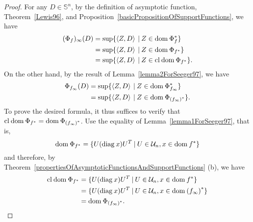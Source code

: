 \documentclass[a4paper,11pt, oneside]{book}
\theoremstyle{definition}
\newcommand{\NDemenstionalRealSymmetricMatrixSpace}{\mathbb{S}^n}
\newcommand{\NDemenstionalRealOthonormalMatrixSpace}{\mathcal{U}_n}
\newcommand{\Closure}[1]{\text{\rm cl\:${#1}$}} %
\newcommand{\Domain}[1]{\text{\rm dom\:${#1}$}} %
\newcommand{\Diagnosis}[1]{\text{\rm diag\:${#1}$}} %
\newcommand{\InnerProduct}[2]{\left\langle {#1},{#2}\right\rangle} %
\newcommand{\ConjugateFunction}[1]{{#1}^*}
\newcommand{\SetForm}[2]{
  \{{#1}\:|\:{#2}\}
}
\begin{document}
\begin{proof}
  For any $D \in \NDemenstionalRealSymmetricMatrixSpace$, by the definition of asymptotic function, Theorem~\ref{Lewis96}, and Proposition~\ref{basicPropositionOfSupportFunctions}, we have
  \begin{equation}
    \begin{split}
      (\Phi_f)_{\infty}(D) &= \sup \{\InnerProduct{Z}{D} \:|\: Z \in \Domain{\Phi_{f}^*} \}\\
      &= \sup \{\InnerProduct{Z}{D} \:|\: Z \in \Domain{\Phi_{\ConjugateFunction{f}}} \}\\
      &= \sup \{\InnerProduct{Z}{D} \:|\: Z \in \Closure{\Domain{\Phi_{\ConjugateFunction{f}}}} \}. \notag
    \end{split}
  \end{equation}
  On the other hand, by the result of Lemma~\ref{lemma2ForSeeger97}, we have
  \begin{equation}
    \begin{split}
      \Phi_{f_{\infty}}(D) &= \sup \{\InnerProduct{Z}{D} \:|\: Z \in \Domain{\Phi_{f_{\infty}}^*} \}\\
      &= \sup \{\InnerProduct{Z}{D} \:|\: Z \in \Domain{\Phi_{\ConjugateFunction{(f_{\infty})}}} \}. \notag
    \end{split}
  \end{equation}
  To prove the desired formula, it thus suffices to verify that $\Closure{\Domain{\Phi_{\ConjugateFunction{f}}}} = \Domain{\Phi_{\ConjugateFunction{(f_{\infty})}}}$. Use the equality of Lemma~\ref{lemma1ForSeeger97}, that is,
  \begin{equation}
    \Domain{\Phi_{\ConjugateFunction{f}}} = \SetForm{U (\Diagnosis{x}) U^T}{U \in \NDemenstionalRealOthonormalMatrixSpace, x \in \Domain{\ConjugateFunction{f}}} \notag
  \end{equation}
  and therefore, by Theorem~\ref{propertiesOfAsymptoticFunctionsAndSupportFunctions} (b), we have
  \begin{equation}
    \begin{split}
      \Closure{\Domain{\Phi_{\ConjugateFunction{f}}}} &= \SetForm{U (\Diagnosis{x}) U^T}{U \in \NDemenstionalRealOthonormalMatrixSpace, x \in \Domain{\ConjugateFunction{f}}} \\
      &= \SetForm{U(\Diagnosis{x})U^T}{U \in \NDemenstionalRealOthonormalMatrixSpace, x \in \Domain{\ConjugateFunction{(f_{\infty})}}} \\
      &= \Domain{\Phi_{\ConjugateFunction{(f_{\infty})}}}. \notag
    \end{split}
  \end{equation}
\end{proof}
\end{document}
